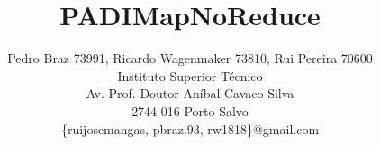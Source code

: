 \documentclass[times, 10pt,twocolumn]{article}
\begin{document}
\title{PADIMapNoReduce}

\author{Pedro Braz 73991, Ricardo Wagenmaker 73810, Rui Pereira 70600\\
Instituto Superior Técnico\\ Av. Prof. Doutor Aníbal Cavaco Silva\\2744-016 Porto Salvo\\
\{ruijosemangas, pbraz.93, rw1818\}@gmail.com
}

\maketitle
\thispagestyle{empty}





\nocite{ex1,ex2}


\end{document}
